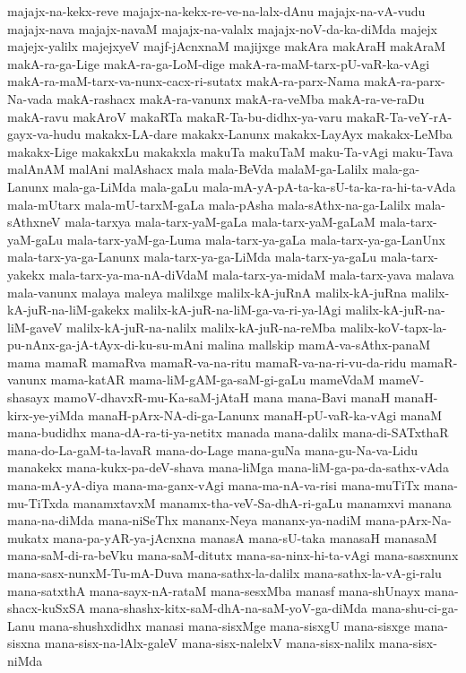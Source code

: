 {majajx-na-kekx-reve
majajx-na-kekx-re-ve-na-lalx-dAnu
majajx-na-vA-vudu
majajx-nava
majajx-navaM
majajx-na-valalx
majajx-noV-da-ka-diMda
majejx
majejx-yalilx
majejxyeV
majf-jAcnxnaM
majijxge
makAra
makAraH
makAraM
makA-ra-ga-Lige
makA-ra-ga-LoM-dige
makA-ra-maM-tarx-pU-vaR-ka-vAgi
makA-ra-maM-tarx-va-nunx-cacx-ri-sutatx
makA-ra-parx-Nama
makA-ra-parx-Na-vada
makA-rashacx
makA-ra-vanunx
makA-ra-veMba
makA-ra-ve-raDu
makA-ravu
makAroV
makaRTa
makaR-Ta-bu-didhx-ya-varu
makaR-Ta-veY-rA-gayx-va-hudu
makakx-LA-dare
makakx-Lanunx
makakx-LayAyx
makakx-LeMba
makakx-Lige
makakxLu
makakxla
makuTa
makuTaM
maku-Ta-vAgi
maku-Tava
malAnAM
malAni
malAshacx
mala
mala-BeVda
malaM-ga-Lalilx
mala-ga-Lanunx
mala-ga-LiMda
mala-gaLu
mala-mA-yA-pA-ta-ka-sU-ta-ka-ra-hi-ta-vAda
mala-mUtarx
mala-mU-tarxM-gaLa
mala-pAsha
mala-sAthx-na-ga-Lalilx
mala-sAthxneV
mala-tarxya
mala-tarx-yaM-gaLa
mala-tarx-yaM-gaLaM
mala-tarx-yaM-gaLu
mala-tarx-yaM-ga-Luma
mala-tarx-ya-gaLa
mala-tarx-ya-ga-LanUnx
mala-tarx-ya-ga-Lanunx
mala-tarx-ya-ga-LiMda
mala-tarx-ya-gaLu
mala-tarx-yakekx
mala-tarx-ya-ma-nA-diVdaM
mala-tarx-ya-midaM
mala-tarx-yava
malava
mala-vanunx
malaya
maleya
malilxge
malilx-kA-juRnA
malilx-kA-juRna
malilx-kA-juR-na-liM-gakekx
malilx-kA-juR-na-liM-ga-va-ri-ya-lAgi
malilx-kA-juR-na-liM-gaveV
malilx-kA-juR-na-nalilx
malilx-kA-juR-na-reMba
malilx-koV-tapx-la-pu-nAnx-ga-jA-tAyx-di-ku-su-mAni
malina
mallskip
mamA-va-sAthx-panaM
mama
mamaR
mamaRva
mamaR-va-na-ritu
mamaR-va-na-ri-vu-da-ridu
mamaR-vanunx
mama-katAR
mama-liM-gAM-ga-saM-gi-gaLu
mameVdaM
mameV-shasayx
mamoV-dhavxR-mu-Ka-saM-jAtaH
mana
mana-Bavi
manaH
manaH-kirx-ye-yiMda
manaH-pArx-NA-di-ga-Lanunx
manaH-pU-vaR-ka-vAgi
manaM
mana-budidhx
mana-dA-ra-ti-ya-netitx
manada
mana-dalilx
mana-di-SATxthaR
mana-do-La-gaM-ta-lavaR
mana-do-Lage
mana-guNa
mana-gu-Na-va-Lidu
manakekx
mana-kukx-pa-deV-shava
mana-liMga
mana-liM-ga-pa-da-sathx-vAda
mana-mA-yA-diya
mana-ma-ganx-vAgi
mana-ma-nA-va-risi
mana-muTiTx
mana-mu-TiTxda
manamxtavxM
manamx-tha-veV-Sa-dhA-ri-gaLu
manamxvi
manana
mana-na-diMda
mana-niSeThx
mananx-Neya
mananx-ya-nadiM
mana-pArx-Na-mukatx
mana-pa-yAR-ya-jAcnxna
manasA
mana-sU-taka
manasaH
manasaM
mana-saM-di-ra-beVku
mana-saM-ditutx
mana-sa-ninx-hi-ta-vAgi
mana-sasxnunx
mana-sasx-nunxM-Tu-mA-Duva
mana-sathx-la-dalilx
mana-sathx-la-vA-gi-ralu
mana-satxthA
mana-sayx-nA-rataM
mana-sesxMba
manasf
mana-shUnayx
mana-shacx-kuSxSA
mana-shashx-kitx-saM-dhA-na-saM-yoV-ga-diMda
mana-shu-ci-ga-Lanu
mana-shushxdidhx
manasi
mana-sisxMge
mana-sisxgU
mana-sisxge
mana-sisxna
mana-sisx-na-lAlx-galeV
mana-sisx-nalelxV
mana-sisx-nalilx
mana-sisx-niMda
}
